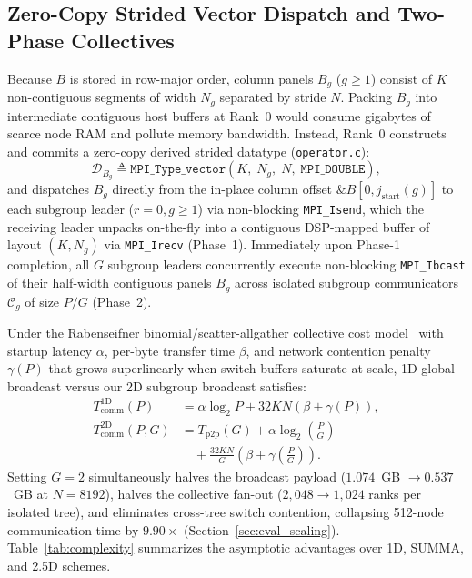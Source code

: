 \documentclass[conference]{IEEEtran}
\begin{document}
\subsection{Zero-Copy Strided Vector Dispatch and Two-Phase Collectives}
Because $B$ is stored in row-major order, column panels $B_g$ ($g \ge 1$) consist of $K$ non-contiguous segments of width $N_g$ separated by stride $N$. Packing $B_g$ into intermediate contiguous host buffers at Rank~0 would consume gigabytes of scarce node RAM and pollute memory bandwidth. Instead, Rank~0 constructs and commits a zero-copy derived strided datatype (\texttt{operator.c}):
\begin{equation}
\mathcal{D}_{B_g} \triangleq \texttt{MPI\_Type\_vector}(K,\; N_g,\; N,\; \texttt{MPI\_DOUBLE}),
\label{eq:mpi_vector}
\end{equation}
and dispatches $B_g$ directly from the in-place column offset $\&B[0, j_{\mathrm{start}}(g)]$ to each subgroup leader ($r=0, g \ge 1$) via non-blocking \texttt{MPI\_Isend}, which the receiving leader unpacks on-the-fly into a contiguous DSP-mapped buffer of layout $(K, N_g)$ via \texttt{MPI\_Irecv} (Phase~1). Immediately upon Phase-1 completion, all $G$ subgroup leaders concurrently execute non-blocking \texttt{MPI\_Ibcast} of their half-width contiguous panels $B_g$ across isolated subgroup communicators $\mathcal{C}_g$ of size $P/G$ (Phase~2).

Under the Rabenseifner binomial/scatter-allgather collective cost model~\cite{thakur2005mpich} with startup latency $\alpha$, per-byte transfer time $\beta$, and network contention penalty $\gamma(P)$ that grows superlinearly when switch buffers saturate at scale, 1D global broadcast versus our 2D subgroup broadcast satisfies:
\begin{equation}
\begin{aligned}
T_{\mathrm{comm}}^{\mathrm{1D}}(P) &= \alpha \log_2 P + 32 K N \left(\beta + \gamma(P)\right), \\
T_{\mathrm{comm}}^{\mathrm{2D}}(P, G) &= T_{\mathrm{p2p}}(G) + \alpha \log_2\!\left(\frac{P}{G}\right) \\
&\quad + \frac{32 K N}{G}\!\left(\beta + \gamma\!\left(\frac{P}{G}\right)\right).
\end{aligned}
\label{eq:comm_cost}
\end{equation}
Setting $G=2$ simultaneously halves the broadcast payload ($1.074$~GB $\to 0.537$~GB at $N=8192$), halves the collective fan-out ($2{,}048 \to 1{,}024$ ranks per isolated tree), and eliminates cross-tree switch contention, collapsing 512-node communication time by $9.90\times$ (Section~\ref{sec:eval_scaling}). Table~\ref{tab:complexity} summarizes the asymptotic advantages over 1D, SUMMA, and 2.5D schemes.
\end{document}
